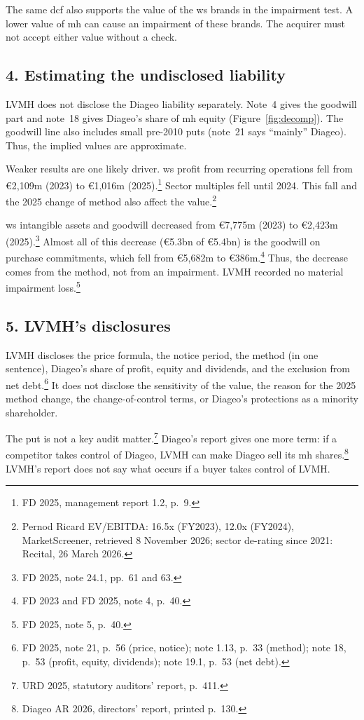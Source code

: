 The same \acs{dcf} also supports the value of the \acs{ws} brands in the impairment test.
A lower value of \acs{mh} can cause an impairment of these brands.
The acquirer must not accept either value without a check.

\subsection*{4. Estimating the undisclosed liability}
LVMH does not disclose the Diageo liability separately.
Note~4 gives the goodwill part and note~18 gives Diageo's share of \acs{mh} equity (Figure~\ref{fig:decomp}).
The goodwill line also includes small pre-2010 puts (note~21 says ``mainly'' Diageo). Thus, the implied values are approximate.

Weaker results are one likely driver. \acs{ws} profit from recurring operations fell from \euro2,109m (2023) to \euro1,016m (2025).\footnote{FD 2025, management report 1.2, p.~9.}
Sector multiples fell until 2024. This fall and the 2025 change of method also affect the value.\footnote{Pernod Ricard EV/EBITDA: 16.5x (FY2023), 12.0x (FY2024), MarketScreener, retrieved 8 November 2026; sector de-rating since 2021: Recital, 26 March 2026.}

\acs{ws} intangible assets and goodwill decreased from \euro7,775m (2023) to \euro2,423m (2025).\footnote{FD 2025, note 24.1, pp.~61 and 63.}
Almost all of this decrease (\euro5.3bn of \euro5.4bn) is the goodwill on purchase commitments, which fell from \euro5,682m to \euro386m.\footnote{FD 2023 and FD 2025, note 4, p.~40.}
Thus, the decrease comes from the method, not from an impairment. LVMH recorded no material impairment loss.\footnote{FD 2025, note 5, p.~40.}

\subsection*{5. LVMH's disclosures}
LVMH discloses the price formula, the notice period, the method (in one sentence), Diageo's share of profit, equity and dividends, and the exclusion from net debt.\footnote{FD 2025, note 21, p.~56 (price, notice); note 1.13, p.~33 (method); note 18, p.~53 (profit, equity, dividends); note 19.1, p.~53 (net debt).}
It does not disclose the sensitivity of the value, the reason for the 2025 method change, the change-of-control terms, or Diageo's protections as a minority shareholder.

The put is not a key audit matter.\footnote{URD 2025, statutory auditors' report, p.~411.}
Diageo's report gives one more term: if a competitor takes control of Diageo, LVMH can make Diageo sell its \acs{mh} shares.\footnote{Diageo AR 2026, directors' report, printed p.~130.}
LVMH's report does not say what occurs if a buyer takes control of LVMH.

